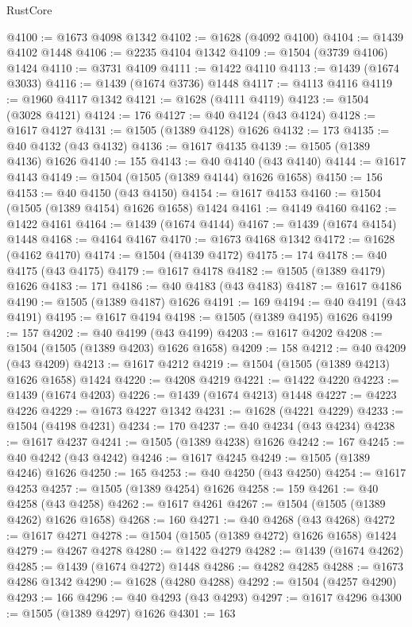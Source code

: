 \begin{lexlean}{RustCore}
\begin{coremodule}
@4100 := @1673 @4098 @1342
@4102 := @1628 (@4092 @4100)
@4104 := @1439 @4102 @1448
@4106 := @2235 @4104 @1342
@4109 := @1504 (@3739 @4106) @1424
@4110 := @3731 @4109
@4111 := @1422 @4110
@4113 := @1439 (@1674 @3033)
@4116 := @1439 (@1674 @3736) @1448
@4117 := @4113 @4116
@4119 := @1960 @4117 @1342
@4121 := @1628 (@4111 @4119)
@4123 := @1504 (@3028 @4121)
@4124 := 176
@4127 := @40 @4124 (@43 @4124)
@4128 := @1617 @4127
@4131 := @1505 (@1389 @4128) @1626
@4132 := 173
@4135 := @40 @4132 (@43 @4132)
@4136 := @1617 @4135
@4139 := @1505 (@1389 @4136) @1626
@4140 := 155
@4143 := @40 @4140 (@43 @4140)
@4144 := @1617 @4143
@4149 := @1504 (@1505 (@1389 @4144) @1626 @1658)
@4150 := 156
@4153 := @40 @4150 (@43 @4150)
@4154 := @1617 @4153
@4160 := @1504 (@1505 (@1389 @4154) @1626 @1658) @1424
@4161 := @4149 @4160
@4162 := @1422 @4161
@4164 := @1439 (@1674 @4144)
@4167 := @1439 (@1674 @4154) @1448
@4168 := @4164 @4167
@4170 := @1673 @4168 @1342
@4172 := @1628 (@4162 @4170)
@4174 := @1504 (@4139 @4172)
@4175 := 174
@4178 := @40 @4175 (@43 @4175)
@4179 := @1617 @4178
@4182 := @1505 (@1389 @4179) @1626
@4183 := 171
@4186 := @40 @4183 (@43 @4183)
@4187 := @1617 @4186
@4190 := @1505 (@1389 @4187) @1626
@4191 := 169
@4194 := @40 @4191 (@43 @4191)
@4195 := @1617 @4194
@4198 := @1505 (@1389 @4195) @1626
@4199 := 157
@4202 := @40 @4199 (@43 @4199)
@4203 := @1617 @4202
@4208 := @1504 (@1505 (@1389 @4203) @1626 @1658)
@4209 := 158
@4212 := @40 @4209 (@43 @4209)
@4213 := @1617 @4212
@4219 := @1504 (@1505 (@1389 @4213) @1626 @1658) @1424
@4220 := @4208 @4219
@4221 := @1422 @4220
@4223 := @1439 (@1674 @4203)
@4226 := @1439 (@1674 @4213) @1448
@4227 := @4223 @4226
@4229 := @1673 @4227 @1342
@4231 := @1628 (@4221 @4229)
@4233 := @1504 (@4198 @4231)
@4234 := 170
@4237 := @40 @4234 (@43 @4234)
@4238 := @1617 @4237
@4241 := @1505 (@1389 @4238) @1626
@4242 := 167
@4245 := @40 @4242 (@43 @4242)
@4246 := @1617 @4245
@4249 := @1505 (@1389 @4246) @1626
@4250 := 165
@4253 := @40 @4250 (@43 @4250)
@4254 := @1617 @4253
@4257 := @1505 (@1389 @4254) @1626
@4258 := 159
@4261 := @40 @4258 (@43 @4258)
@4262 := @1617 @4261
@4267 := @1504 (@1505 (@1389 @4262) @1626 @1658)
@4268 := 160
@4271 := @40 @4268 (@43 @4268)
@4272 := @1617 @4271
@4278 := @1504 (@1505 (@1389 @4272) @1626 @1658) @1424
@4279 := @4267 @4278
@4280 := @1422 @4279
@4282 := @1439 (@1674 @4262)
@4285 := @1439 (@1674 @4272) @1448
@4286 := @4282 @4285
@4288 := @1673 @4286 @1342
@4290 := @1628 (@4280 @4288)
@4292 := @1504 (@4257 @4290)
@4293 := 166
@4296 := @40 @4293 (@43 @4293)
@4297 := @1617 @4296
@4300 := @1505 (@1389 @4297) @1626
@4301 := 163

\end{coremodule}
\end{lexlean}
